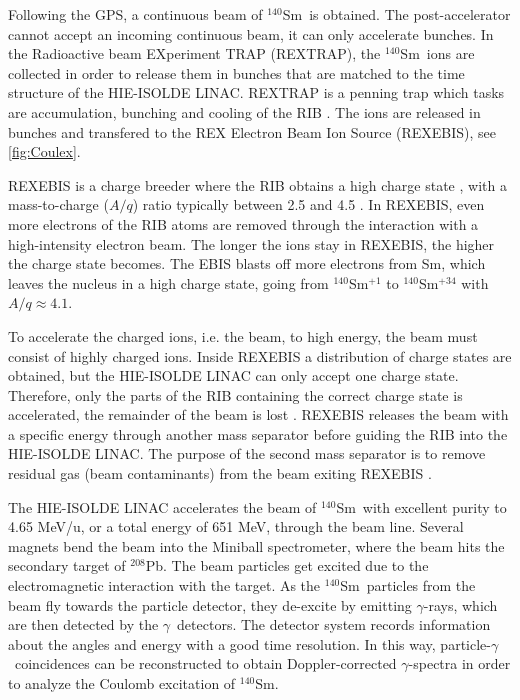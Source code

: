 \documentclass[twoside,english]{uiofysmaster/uiofysmaster}
\newcommand{\Sm}{$^{140}$Sm} %
\newcommand{\Pb}{$^{208}$Pb}
\newcommand{\ga}{$\gamma$}
\let\orgautoref\autoref
\renewcommand{\autoref}
        {%
		 \def\sectionautorefname{Section}%
		 \def\subsectionautorefname{Section}%
		 \def\subsubsectionautorefname{Section}%
		 \def\chapterautorefname{Chapter}%
          \orgautoref}
\begin{document}
Following the GPS, a continuous beam of \Sm\ is obtained. 
The post-accelerator cannot accept an incoming continuous beam, it can only accelerate bunches.
In the Radioactive beam EXperiment TRAP (REXTRAP), the \Sm\ ions are collected in order to release them in bunches that are matched to the time structure of the HIE-ISOLDE LINAC. 
REXTRAP is a penning trap which tasks are accumulation, bunching and cooling of the RIB \cite{HIE-ISOLDE, REXTRAP1, REXTRAP2}. 
The ions are released in bunches and transfered to the REX Electron Beam Ion Source (REXEBIS), see \autoref{fig:Coulex}.

REXEBIS is a charge breeder where the RIB obtains a high charge state \cite{REXEBIS}, with a mass-to-charge ($A/q$) ratio typically between 2.5 and 4.5 \cite{Post-acc}.
In REXEBIS, even more electrons of the RIB atoms are removed through the interaction with a high-intensity electron beam. 
The longer the ions stay in REXEBIS, the higher the charge state becomes. 
The EBIS blasts off more electrons from Sm, which leaves the nucleus in a high charge state, going from \Sm$^{+1}$ to \Sm$^{+34}$ with $A/q \approx 4.1$. 

To accelerate the charged ions, i.e. the beam, to high energy, the beam must consist of highly charged ions. 
Inside REXEBIS a distribution of charge states are obtained, but the HIE-ISOLDE LINAC can only accept one charge state.
Therefore, only the parts of the RIB containing the correct charge state is accelerated, the remainder of the beam is lost \cite{REX-web, HIE-web, EBIS2002, EBIS2010}.
REXEBIS releases the beam with a specific energy through another mass separator before guiding the RIB into the HIE-ISOLDE LINAC. 
The purpose of the second mass separator is to remove residual gas (beam contaminants) from the beam exiting REXEBIS \cite{HIE-ISOLDE}. 

The HIE-ISOLDE LINAC accelerates the beam of \Sm\ with excellent purity to 4.65 MeV/u, or a total energy of 651 MeV, through the beam line. 
Several magnets bend the beam into the Miniball spectrometer, where the beam hits the secondary target of \Pb. 
The beam particles get excited due to the electromagnetic interaction with the target.
As the \Sm\ particles from the beam fly towards the particle detector, they de-excite by emitting \ga-rays, which are then detected by the \ga\ detectors.
The detector system records information about the angles and energy with a good time resolution. 
In this way, particle-\ga\ coincidences can be reconstructed to obtain Doppler-corrected \ga-spectra  in order to analyze the Coulomb excitation of \Sm.
\end{document}
